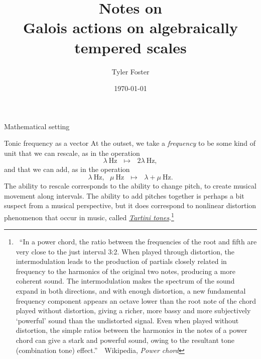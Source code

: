 \documentclass[letterpaper,11pt, reqno]{amsart}
\newtheorem{monodromy theorem}{Monodromy Theorem}[subsection]
\newtheorem{research objectives}{Research objectives}[subsection]
\newtheorem{research question}[theorem]{Research questions}
\newtheorem{aside question}[theorem]{Aside question}
\newtheorem{blank remark}[theorem]{}
\newtheorem{terminology and comment}[theorem]{Terminology and comment}
\newtheorem{purity hypothesis}[theorem]{Purity hypothesis}
\newtheorem{corollary of the purity hypothesis}[theorem]{Corollary of the purity hypothesis}
\numberwithin{equation}{theorem}
\begin{document}
\title{{\smaller\smaller\smaller Notes on}\\ Galois actions on algebraically tempered scales}
\author{Tyler Foster}

\date{\today}

\maketitle
\setcounter{tocdepth}{2}

\tableofcontents

\begin{section}{Mathematical setting}

\begin{subsection}{Tonic frequency as a vector}
At the outset, we take a {\em frequency} to be some kind of unit that we can rescale, as in the operation
\begin{equation}\label{equation: rescale}
\lambda\ \text{Hz}\ \ \ \longmapsto\ \ \ 2\lambda\ \text{Hz},
\end{equation}
and that we can add, as in the operation
\begin{equation}\label{equation: add}
\lambda\ \text{Hz},\ \ \ \mu\ \text{Hz}\ \ \ \longmapsto\ \ \ \lambda+\mu\ \text{Hz}.
\end{equation}
The ability to rescale corresponds to the ability to change pitch, to create musical movement along intervals. The ability to add pitches together is perhaps a bit suspect from a musical perspective, but it does correspond to nonlinear distortion phenomenon that occur in music, called \href{https://en.wikipedia.org/wiki/Combination_tone}{{\em Tartini tones}}.\footnote{\ ``In a power chord, the ratio between the frequencies of the root and fifth are very close to the just interval 3:2. When played through distortion, the intermodulation leads to the production of partials closely related in frequency to the harmonics of the original two notes, producing a more coherent sound. The intermodulation makes the spectrum of the sound expand in both directions, and with enough distortion, a new fundamental frequency component appears an octave lower than the root note of the chord played without distortion, giving a richer, more bassy and more subjectively `powerful' sound than the undistorted signal. Even when played without distortion, the simple ratios between the harmonics in the notes of a power chord can give a stark and powerful sound, owing to the resultant tone (combination tone) effect.''\ \textemdash\ Wikipedia, {\em Power chord}}


\end{subsection}
\end{section}
\end{document}
